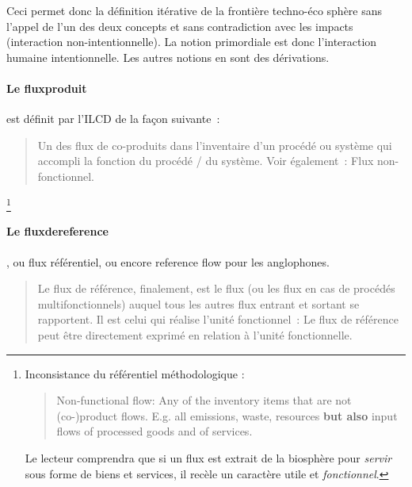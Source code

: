 Ceci permet donc la définition itérative de la frontière techno-éco sphère sans l'appel de l'un des deux concepts et sans contradiction avec les impacts (interaction non-intentionnelle).
La notion primordiale est donc l'interaction humaine intentionnelle.
Les autres notions en sont des dérivations.
\paragraph{Le \gls{fluxproduit}} est définit par l'ILCD de la façon suivante~:
\blockcquote[traduction p.22]{european_commission_ilcd_2010}{
Un des flux de co-produits dans l'inventaire d'un procédé ou système qui accompli la fonction du procédé / du système.
Voir également~: Flux non-fonctionnel.
}
\footnote{Inconsistance du référentiel méthodologique : \blockcquote[p.22]{european_commission_ilcd_2010}{Non-functional flow: Any of the inventory items that are not (co-)product flows. E.g. all emissions, waste, resources \textbf{but also} input flows of processed goods and of services.}
Le lecteur comprendra que si un flux est extrait de la biosphère pour \emph{servir} sous forme de biens et services, il recèle un caractère utile et \emph{fonctionnel}.}

\paragraph{Le \gls{fluxdereference}}, ou flux référentiel, ou encore reference flow pour les anglophones.\blockcquote[Traduit de Terms and concepts: Function, functional unit, and reference flow p.60]{european_commission_ilcd_2010}
{Le flux de référence, finalement, est le flux (ou les flux en cas de procédés multifonctionnels) auquel tous les autres flux entrant et sortant se rapportent. Il est celui qui réalise l'unité fonctionnel~: Le flux de référence peut être directement exprimé en relation à l'unité fonctionnelle.}
%

